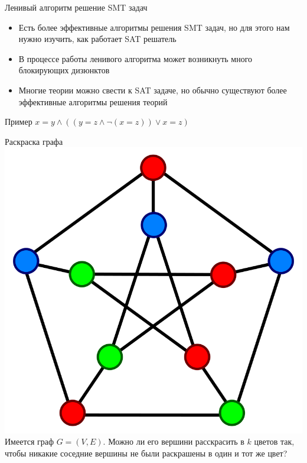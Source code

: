 \documentclass{beamer}
\begin{document}
\begin{frame}{Ленивый алгоритм решение SMT задач}
\begin{itemize}
\item Есть более эффективные алгоритмы решения SMT задач, но для этого нам нужно изучить, как работает SAT решатель
\item В процессе работы ленивого алгоритма может возникнуть много блокирующих дизюнктов
\item Многие теории можно свести к SAT задаче, но обычно существуют более эффективные алгоритмы решения теорий
\end{itemize}
\end{frame}

\begin{frame}{Пример}
$x = y \wedge ((y = z \wedge \lnot(x = z)) \vee x = z)$
\end{frame}

\begin{frame}{Раскраска графа}
\includegraphics[scale=0.1]{graph-coloring.svg.png}
Имеется граф $G = (V, E)$. Можно ли его вершини расскрасить в $k$ цветов так, чтобы никакие соседние вершины не были раскрашены
в один и тот же цвет?
\end{frame}
\end{document}
